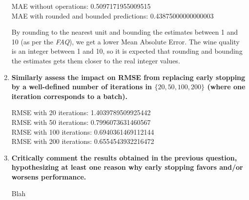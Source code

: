 \documentclass[12pt]{article}
\begin{document}
\begin{enumerate}[leftmargin=\labelsep]
          \vskip 0.3cm
          

          MAE without operations: 0.5097171955009515 \\
          MAE with rounded and bounded predictions: 0.43875000000000003

          \vskip 0.2cm
          By rounding to the nearest unit and bounding the estimates between 1 and 10 (as per the \textit{FAQ}), we get a lower Mean Absolute Error.
          The wine quality is an integer between 1 and 10, so it is expected that rounding and bounding the estimates gets them closer to the real integer values.

    \item \textbf{Similarly assess the impact on RMSE from replacing early stopping by a well-defined
          number of iterations in $\{20,50,100,200\}$ (where one iteration corresponds to a batch).}

          \vskip 0.3cm
          

          RMSE with 20 iterations: 1.4039789509925442  \\
          RMSE with 50 iterations: 0.7996073631460567  \\
          RMSE with 100 iterations: 0.6940361469112144 \\
          RMSE with 200 iterations: 0.6554543932216472

    \item \textbf{Critically comment the results obtained in the previous question, hypothesizing at least
          one reason why early stopping favors and/or worsens performance.}

          \vskip 0.3cm
          Blah
\end{enumerate}
\end{document}
